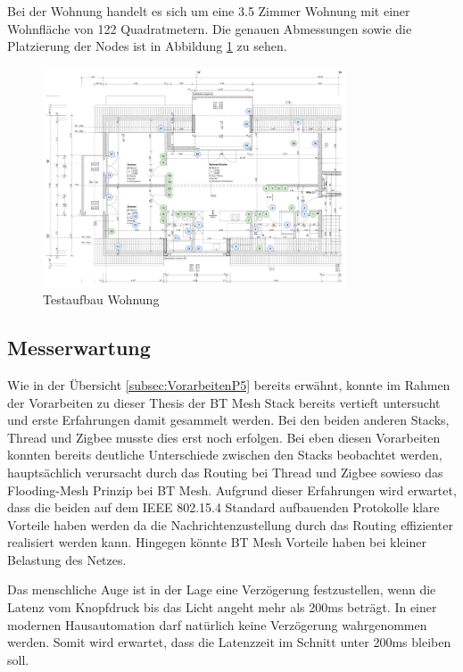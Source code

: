 Bei der Wohnung handelt es sich um eine 3.5 Zimmer Wohnung mit einer Wohnfläche von 122 Quadratmetern. Die genauen Abmessungen sowie die Platzierung der Nodes ist in Abbildung \ref{fig:TestaufbauWohnung} zu sehen.


\begin{figure}[h]
	\centering
	\includegraphics[width=0.8\textwidth]{graphics/Plan_Wohnung_Cyrill_Nodes_Placement.png}
	\caption{Testaufbau Wohnung}
	\label{fig:TestaufbauWohnung}
\end{figure}

\subsection{Messerwartung}
Wie in der Übersicht \ref{subsec:VorarbeitenP5} bereits erwähnt, konnte im Rahmen der Vorarbeiten zu dieser Thesis der BT Mesh Stack bereits vertieft untersucht und erste Erfahrungen damit gesammelt werden. Bei den beiden anderen Stacks, Thread und Zigbee musste dies erst noch erfolgen.
Bei eben diesen Vorarbeiten konnten bereits deutliche Unterschiede zwischen den Stacks beobachtet werden, hauptsächlich verursacht durch das Routing bei Thread und Zigbee sowieso das Flooding-Mesh Prinzip bei BT Mesh.
Aufgrund dieser Erfahrungen wird erwartet, dass die beiden auf dem IEEE 802.15.4 Standard aufbauenden Protokolle klare Vorteile haben werden da die Nachrichtenzustellung durch das Routing effizienter realisiert werden kann.
Hingegen könnte BT Mesh Vorteile haben bei kleiner Belastung des Netzes.

Das menschliche Auge ist in der Lage eine Verzögerung festzustellen, wenn die Latenz vom Knopfdruck bis das Licht angeht mehr als 200ms beträgt. In einer modernen Hausautomation darf natürlich keine Verzögerung wahrgenommen werden. Somit wird erwartet, dass die Latenzzeit im Schnitt unter 200ms bleiben soll. \cite{silicon_laboratories_inc_an1142_2020}